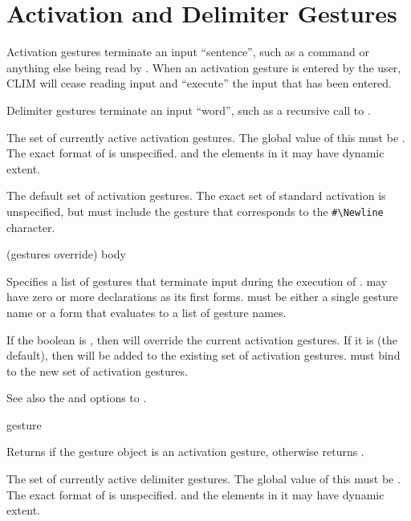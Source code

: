 \section {Activation and Delimiter Gestures}

Activation gestures terminate an input ``sentence'', such as a command or
anything else being read by .  When an activation gesture is entered
by the user, CLIM will cease reading input and ``execute'' the input that has
been entered.

Delimiter gestures terminate an input ``word'', such as a recursive call to
.



The set of currently active activation gestures.  The global value of this must
be .  The exact format of  is unspecified.
 and the elements in it may have dynamic extent.


The default set of activation gestures.  The exact set of standard activation
is unspecified, but must include the gesture that corresponds to the
\verb+#\Newline+ character.

 {(gestures \key override) \body body}

Specifies a list of gestures that terminate input during the execution of
.   may have zero or more declarations as its first forms.
 must be either a single gesture name or a form that evaluates to
a list of gesture names.

If the boolean  is , then  will override
the current activation gestures.  If it is  (the default), then
 will be added to the existing set of activation gestures.
 must bind  to the new
set of activation gestures.

See also the  and 
options to .

 {gesture}

Returns  if the gesture object  is an activation
gesture, otherwise returns .



The set of currently active delimiter gestures.  The global value of this must
be .  The exact format of  is unspecified.
 and the elements in it may have dynamic extent.

